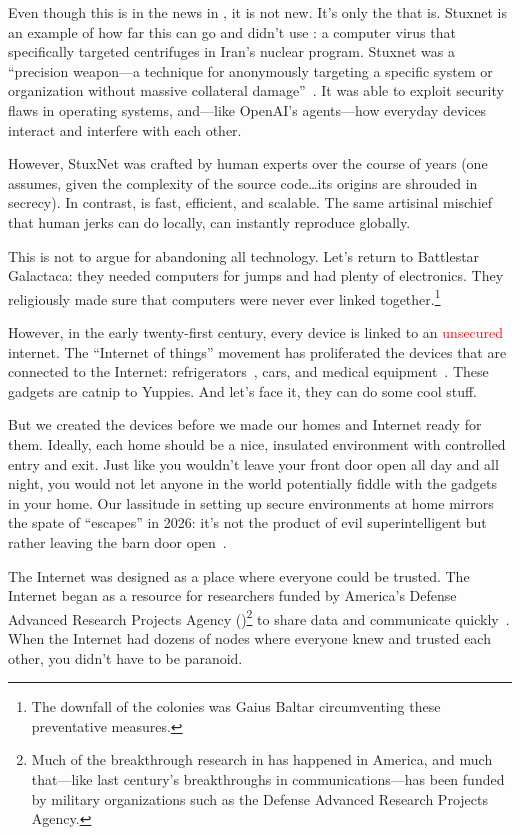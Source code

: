 Even though this is in the news in \currentyear{}, it is not new.  It's only the  that is.
Stuxnet is an example of how far this can go and didn't use : a computer virus that
specifically targeted centrifuges in Iran's nuclear program.
%
Stuxnet was a ``precision weapon---a technique for anonymously
targeting a specific system or organization without massive collateral
damage''~\citep{lachow-11}.
%
It was able to exploit security flaws in operating systems, and---like
OpenAI's agents---how everyday devices
interact and interfere with each other.

However, StuxNet was crafted by human experts over the course of years (one
assumes, given the complexity of the source code\dots its origins are
shrouded in secrecy).
%
In contrast,  is fast, efficient, and scalable.
%
The same artisinal
mischief that human jerks can do locally,  can
instantly reproduce globally.  

This is not to argue for abandoning all technology.
%
%
Let's return to Battlestar Galactaca: they needed computers for jumps and had plenty of electronics.
%
They religiously made sure that computers were never ever linked
together.\footnote{The downfall of the colonies was Gaius Baltar
  circumventing these preventative measures.}


However, in the early twenty-first century, every device is linked to
an \textcolor{red}{unsecured} internet.
%
The ``Internet of things'' movement has proliferated the devices that
are connected to the Internet: refrigerators~\citep{tanczer-18}, cars,
and medical equipment~\citep{yaqoob-19}.
%
These gadgets are catnip to Yuppies.  And let's face it, they can do some cool stuff.

But we created the devices before we made our homes and Internet ready
for them.
%
Ideally, each home should be a nice, insulated environment
with controlled entry and exit.
%
Just like you wouldn't leave your
front door open all day and all night, you would not let anyone in the
world potentially fiddle with the gadgets in your home.
%
Our lassitude in setting up secure environments at home mirrors the
spate of ``escapes'' in 2026: it's not the product of evil
superintelligent  but rather leaving the barn door open~\cite{}.

The Internet was designed as a place where everyone could be trusted.
The Internet began as a resource for researchers funded by
America's Defense Advanced Research Projects Agency ()\footnote{Much of the breakthrough
  research in  has happened in America, and much that---like
  last century's breakthroughs in communications---has been funded by
  military organizations such as the Defense Advanced Research
  Projects Agency.} to share data and communicate
quickly~\citep{leiner-09}.
%
When the Internet had dozens of nodes where everyone knew and trusted
each other, you didn't have to be paranoid.

